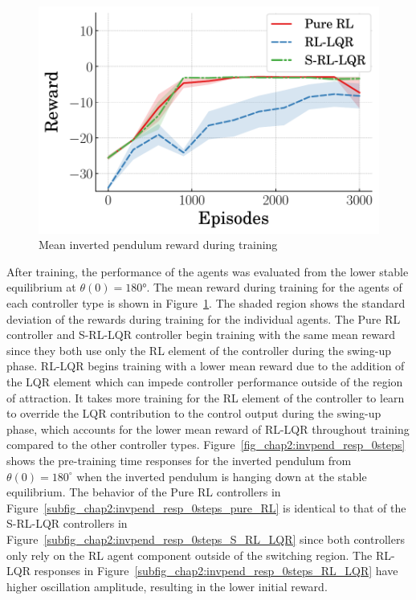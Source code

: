%
\begin{figure}[t]
    \centering
    \includegraphics[scale=0.65]{figures/figures_RL_model_based_control/training_reward_trend}
    \caption{Mean inverted pendulum reward during training}
    \label{fig:Reward_trend}
\end{figure}
%
After training, the performance of the agents was evaluated from the lower stable equilibrium at $\theta(0)=180\si{\degree}$.
The mean reward during training for the agents of each controller type is shown in Figure~\ref{fig:Reward_trend}. The shaded region shows the standard deviation of the rewards during training for the individual agents. The Pure RL controller and S-RL-LQR controller begin training with the same mean reward since they both use only the RL element of the controller during the swing-up phase.
%
RL-LQR begins training with a lower mean reward due to the addition of the LQR element which can impede controller performance outside of the region of attraction. It takes more training for the RL element of the controller to learn to override the LQR contribution to the control output during the swing-up phase, which accounts for the lower mean reward of RL-LQR throughout training compared to the other controller types.
%
Figure~\ref{fig_chap2:invpend_resp_0steps} shows the pre-training time responses for the inverted pendulum from $\theta(0)=180^{\circ}$ when the inverted pendulum is hanging down at the stable equilibrium.
The behavior of the Pure RL controllers in Figure~\ref{subfig_chap2:invpend_resp_0steps_pure_RL} is identical to that of the S-RL-LQR controllers in Figure~\ref{subfig_chap2:invpend_resp_0steps_S_RL_LQR} since both controllers only rely on the RL agent component outside of the switching region. The RL-LQR responses in Figure~\ref{subfig_chap2:invpend_resp_0steps_RL_LQR} have higher oscillation amplitude, resulting in the lower initial reward.

